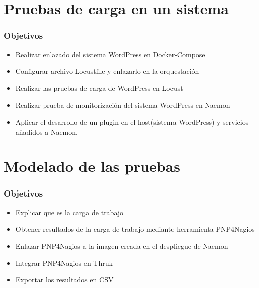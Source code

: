 \documentclass{beamer}
\theoremstyle{plain}
\theoremstyle{definition}
\theoremstyle{plain}
\theoremstyle{definition}
\theoremstyle{remark}
\theoremstyle{definition}
\begin{document}
\section{Pruebas de carga en un sistema} %
\begin{frame}
	
	\frametitle{Objetivos}
	\begin{itemize}
		\item Realizar enlazado del sistema WordPress en Docker-Compose
		\item Configurar archivo Locustfile y enlazarlo en la orquestación
		\item Realizar las pruebas de carga de WordPress en Locust
		\item Realizar prueba de monitorización del sistema WordPress en Naemon
		\item Aplicar el desarrollo de un plugin en el host(sistema WordPress) y servicios añadidos a Naemon.		
	\end{itemize}
	
\end{frame}

\section{Modelado de las pruebas} %
\begin{frame}
	
	\frametitle{Objetivos}
	\begin{itemize}
		\item Explicar que es la carga de trabajo
		\item Obtener resultados de la carga de trabajo mediante herramienta PNP4Nagios
		\item Enlazar PNP4Nagios a la imagen creada en el despliegue de Naemon
		\item Integrar PNP4Nagios en Thruk
		\item Exportar los resultados en CSV			
	\end{itemize}
	
\end{frame}
\end{document}
